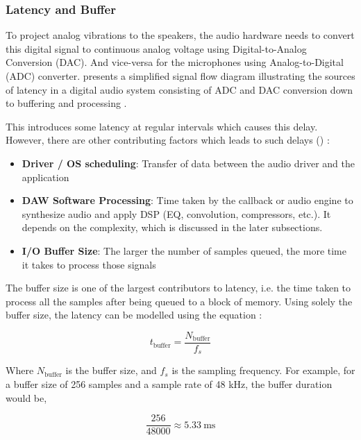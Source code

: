 \subsubsection{Latency and Buffer}

To project analog vibrations to the speakers,  the audio hardware needs to convert this digital signal to
continuous analog voltage using Digital-to-Analog Conversion (DAC). And vice-versa for the microphones using
Analog-to-Digital (ADC) converter.  presents a simplified signal flow diagram illustrating 
the sources of latency in a digital audio system consisting of ADC and DAC conversion down to buffering and 
processing \cite{burg2014latency}.



This introduces some latency at regular intervals which causes this delay. However, there are other contributing factors which leads
to such delays () \cite{openai_chatgpt}:

\begin{itemize}
    \item \textbf{Driver / OS scheduling}: Transfer of data between the audio driver and the application
    \item \textbf{DAW Software Processing}: Time taken by the callback or audio engine to synthesize audio and apply DSP 
    (EQ, convolution, compressors, etc.). It depends on the complexity, which is discussed in the later subsections.
    \item \textbf{I/O Buffer Size}: The larger the number of samples queued, the more time it takes to process those signals 
\end{itemize}

The buffer size is one of the largest contributors to latency, i.e. the time taken to process all the samples after being 
queued to a block of memory. Using solely the buffer size, the latency can be modelled using the equation \cite{burg2014latency}:

\begin{equation}\label{eq:buffer_latency}
    t_{\text{buffer}} = \frac{ N_{\text{buffer}} }{f_s}
\end{equation}

Where $N_{\text{buffer}}$ is the buffer size, and $f_s$ is the sampling frequency. For example, for a buffer size of 256 
samples and a sample rate of 48 kHz, the buffer duration would be,

$$
\frac{256}{48000} \approx \SI{5.33}{\milli \second}
$$
